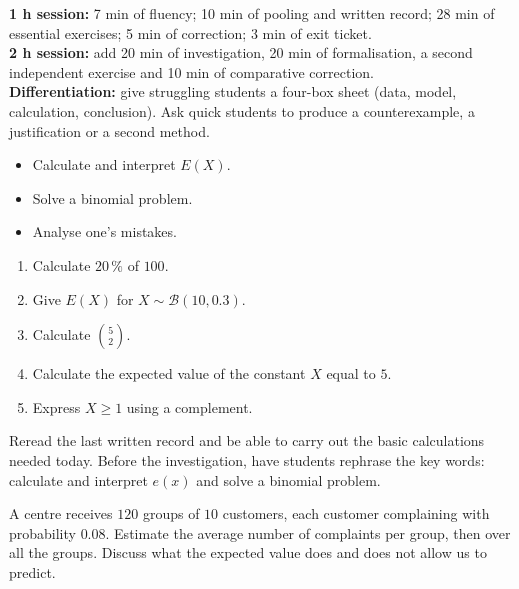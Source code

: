 \ifprof
\begin{methode}
\textbf{1 h session:} 7 min of fluency; 10 min of pooling and written record; 28 min of essential exercises; 5 min of correction; 3 min of exit ticket.\\
\textbf{2 h session:} add 20 min of investigation, 20 min of formalisation, a second independent exercise and 10 min of comparative correction.\\
\textbf{Differentiation:} give struggling students a four-box sheet (data, model, calculation, conclusion). Ask quick students to produce a counterexample, a justification or a second method.
\end{methode}
\fi
{}
\begin{objectifs}\begin{itemize}\item Calculate and interpret $E(X)$.\item Solve a binomial problem.\item Analyse one's mistakes.\end{itemize}\end{objectifs}
\begin{automatismes}\begin{enumerate}\item Calculate $20\,\%$ of $100$. \item Give $E(X)$ for $X\sim\mathcal B(10,0.3)$. \item Calculate $\binom52$. \item Calculate the expected value of the constant $X$ equal to $5$. \item Express $X\geq1$ using a complement. \end{enumerate}\end{automatismes}
\begin{prerequis}Reread the last written record and be able to carry out the basic calculations needed today. Before the investigation, have students rephrase the key words: calculate and interpret $e(x)$ and solve a binomial problem.\end{prerequis}

\begin{activite}
A centre receives $120$ groups of $10$ customers, each customer complaining with probability $0.08$. Estimate the average number of complaints per group, then over all the groups. Discuss what the expected value does and does not allow us to predict.

\end{activite}

